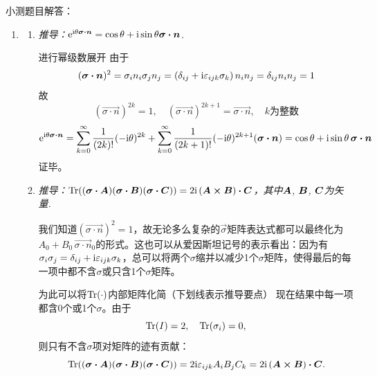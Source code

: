 小测题目解答：
\begin{enumerate}[label=\textbf{6.\Alph*}, listparindent=\parindent, leftmargin=-0.5mm]

\item 
\begin{enumerate}[listparindent=\parindent]
\item \emph{推导：$\mathrm{e}^{\mathrm{i}\theta \boldsymbol{\sigma\cdot n}}=\cos\theta+\mathrm{i}\sin\theta\boldsymbol{\sigma\cdot n}$.}

进行幂级数展开
由于
\[(\boldsymbol{\sigma\cdot n})^2 = \sigma_in_i\sigma_j n_j = (\delta_{ij}+\mathrm{i}\varepsilon_{ijk}\sigma_k)\,n_in_j = \delta_{ij}n_in_j = 1\]
故\[(\vec{\sigma\cdot n})^{2k}=1,\quad(\vec{\sigma\cdot n})^{2k+1}=\vec{\sigma\cdot n},\quad \text{$k$为整数}\]
\[\mathrm{e}^{\mathrm{i}\theta\boldsymbol{\sigma\cdot n}}=\sum_{k=0}^{\infty}\frac{1}{(2k)!}(-\mathrm{i}\theta)^{2k}+\sum_{k=0}^{\infty}\frac{1}{(2k+1)!}(-\mathrm{i}\theta)^{2k+1}(\boldsymbol{\sigma\cdot n})=\cos\theta + \mathrm{i}\sin\theta\,\boldsymbol{\sigma\cdot n}\]
证毕。

\item \emph{推导：$\Tr((\boldsymbol{\sigma\cdot A})(\boldsymbol{\sigma\cdot B})(\boldsymbol{\sigma\cdot C})) = 2\mathrm{i}\,(\boldsymbol{A\times B})\boldsymbol{\cdot}\boldsymbol{C}$，其中${\boldsymbol{A}}$, ${\boldsymbol{B}}$, ${\boldsymbol{C}}$为矢量.}

我们知道$(\vec{\sigma\cdot n})^2=1$，故无论多么复杂的$\vec{\sigma}$矩阵表达式都可以最终化为$A_0+B_0\,\vec{\sigma\cdot n}_0$的形式。这也可以从爱因斯坦记号的表示看出：因为有$\sigma_i\sigma_j=\delta_{ij}+\mathrm{i}\varepsilon_{ijk}\sigma_k$，总可以将两个$\sigma$缩并以减少1个$\sigma$矩阵，使得最后的每一项中都不含$\sigma$或只含1个$\sigma$矩阵。

为此可以将$\Tr(\cdot)$内部矩阵化简（下划线表示推导要点）
现在结果中每一项都含0个或1个$\sigma$。由于
\[\Tr(I)=2,\quad \Tr(\sigma_i)=0,\]
则只有不含$\sigma$项对矩阵的迹有贡献：\[\Tr((\boldsymbol{\sigma\cdot A})(\boldsymbol{\sigma\cdot B})(\boldsymbol{\sigma\cdot C}))=2\mathrm{i}\varepsilon_{ijk}A_iB_jC_k=2\mathrm{i}\,(\boldsymbol{A\times B})\boldsymbol{\cdot}\boldsymbol{C}.\]


\end{enumerate}
\end{enumerate}

